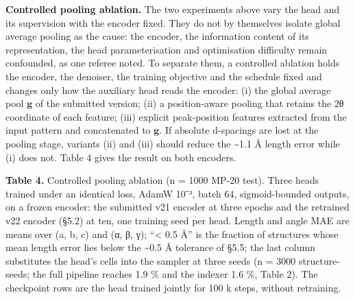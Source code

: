 \documentclass[
  11pt,
]{article}
\begin{document}
\textbf{Controlled pooling ablation.} The two experiments above vary the
head and its supervision with the encoder fixed. They do not by
themselves isolate global average pooling as the cause: the encoder, the
information content of its representation, the head parameterisation and
optimisation difficulty remain confounded, as one referee noted. To
separate them, a controlled ablation holds the encoder, the denoiser,
the training objective and the schedule fixed and changes only how the
auxiliary head reads the encoder: (i) the global average pool
\(\mathbf{g}\) of the submitted version; (ii) a position-aware pooling
that retains the 2θ coordinate of each feature; (iii) explicit
peak-position features extracted from the input pattern and concatenated
to \(\mathbf{g}\). If absolute d-spacings are lost at the pooling stage,
variants (ii) and (iii) should reduce the \textasciitilde1.1 Å length
error while (i) does not. Table 4 gives the result on both encoders.

\textbf{Table 4.} Controlled pooling ablation (n = 1000 MP-20 test).
Three heads trained under an identical loss, AdamW 10⁻³, batch 64,
sigmoid-bounded outputs, on a frozen encoder: the submitted v21 encoder
at three epochs and the retrained v22 encoder (§5.2) at ten, one
training seed per head. Length and angle MAE are means over (a, b, c)
and (α, β, γ); ``\textless{} 0.5 Å'' is the fraction of structures whose
mean length error lies below the \textasciitilde0.5 Å tolerance of §5.5;
the last column substitutes the head's cells into the sampler at three
seeds (n = 3000 structure-seeds; the full pipeline reaches 1.9 \% and
the indexer 1.6 \%, Table 2). The checkpoint rows are the head trained
jointly for 100 k steps, without retraining.
\end{document}
